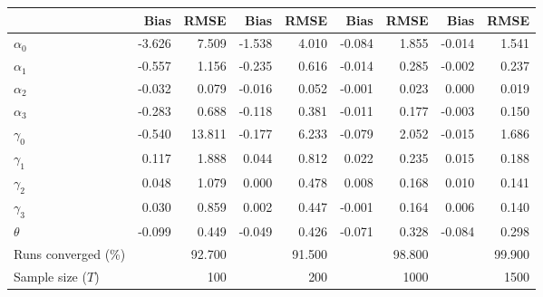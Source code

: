 
\begin{tabular}[t]{lrrrrrrrr}
\toprule
  & Bias & RMSE & Bias & RMSE & Bias & RMSE & Bias & RMSE\\
\midrule
$\alpha_{0}$ & -3.626 & 7.509 & -1.538 & 4.010 & -0.084 & 1.855 & -0.014 & 1.541\\
$\alpha_{1}$ & -0.557 & 1.156 & -0.235 & 0.616 & -0.014 & 0.285 & -0.002 & 0.237\\
$\alpha_{2}$ & -0.032 & 0.079 & -0.016 & 0.052 & -0.001 & 0.023 & 0.000 & 0.019\\
$\alpha_{3}$ & -0.283 & 0.688 & -0.118 & 0.381 & -0.011 & 0.177 & -0.003 & 0.150\\
$\gamma_{0}$ & -0.540 & 13.811 & -0.177 & 6.233 & -0.079 & 2.052 & -0.015 & 1.686\\
$\gamma_{1}$ & 0.117 & 1.888 & 0.044 & 0.812 & 0.022 & 0.235 & 0.015 & 0.188\\
$\gamma_{2}$ & 0.048 & 1.079 & 0.000 & 0.478 & 0.008 & 0.168 & 0.010 & 0.141\\
$\gamma_{3}$ & 0.030 & 0.859 & 0.002 & 0.447 & -0.001 & 0.164 & 0.006 & 0.140\\
$\theta$ & -0.099 & 0.449 & -0.049 & 0.426 & -0.071 & 0.328 & -0.084 & 0.298\\
Runs converged (\%) &  & 92.700 &  & 91.500 &  & 98.800 &  & 99.900\\
Sample size ($T$) &  & 100 &  & 200 &  & 1000 &  & 1500\\
\bottomrule
\end{tabular}
